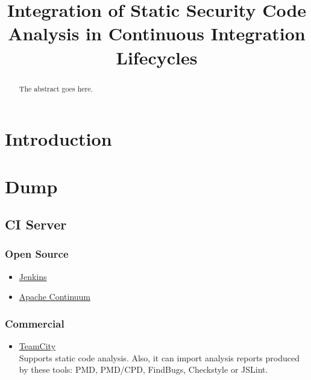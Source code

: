 \documentclass[a4paper,conference]{IEEEtran}
\begin{document}
\title{Integration of Static Security Code Analysis in Continuous Integration Lifecycles}


\author{
}


\maketitle


%
%

\begin{abstract}
The abstract goes here.
\end{abstract}


\section{Introduction}



\section{Dump}

\subsection{CI Server}

\subsubsection{Open Source}
\begin{itemize}
	\item \href{http://jenkins-ci.org}{Jenkins}
	\item \href{http://continuum.apache.org}{Apache Continuum}
\end{itemize}

\subsubsection{Commercial}
\begin{itemize}
	\item \href{http://www.jetbrains.com/teamcity}{TeamCity}\\
	Supports static code analysis. Also, it can import analysis reports produced by these tools: PMD, PMD/CPD, FindBugs, Checkstyle or JSLint.
\end{itemize}
\end{document}
